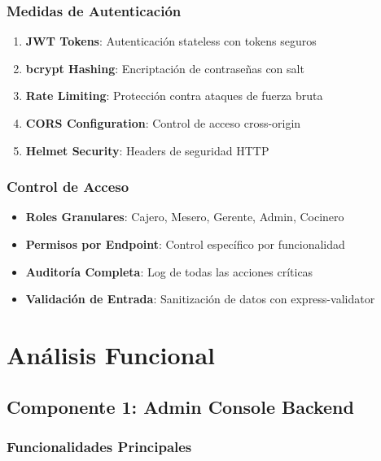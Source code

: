 \documentclass[12pt,a4paper]{article}
\begin{document}
\subsubsection{Medidas de Autenticación}

\begin{enumerate}
    \item \textbf{JWT Tokens}: Autenticación stateless con tokens seguros
    \item \textbf{bcrypt Hashing}: Encriptación de contraseñas con salt
    \item \textbf{Rate Limiting}: Protección contra ataques de fuerza bruta
    \item \textbf{CORS Configuration}: Control de acceso cross-origin
    \item \textbf{Helmet Security}: Headers de seguridad HTTP
\end{enumerate}

\subsubsection{Control de Acceso}

\begin{itemize}
    \item \textbf{Roles Granulares}: Cajero, Mesero, Gerente, Admin, Cocinero
    \item \textbf{Permisos por Endpoint}: Control específico por funcionalidad
    \item \textbf{Auditoría Completa}: Log de todas las acciones críticas
    \item \textbf{Validación de Entrada}: Sanitización de datos con express-validator
\end{itemize}

\section{Análisis Funcional}

\subsection{Componente 1: Admin Console Backend}

\subsubsection{Funcionalidades Principales}
\end{document}
